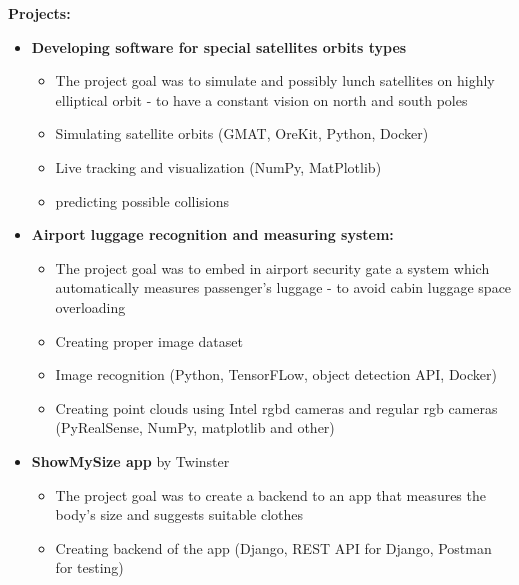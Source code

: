 \documentclass[10pt,a4paper,ragged2e,withhyper, normalphoto]{altacv}
\begin{document}
\begin{paracol}{2}


    \textbf{Projects:}
    \begin{itemize}
        \item\textbf{\textcolor{DarkPastelRed}{Developing software for special satellites orbits types}}
        \begin{itemize}
            \item The project goal was to simulate and possibly lunch satellites on highly elliptical orbit - to have a constant vision on north and south poles
            \item Simulating satellite orbits (GMAT, OreKit, Python, Docker)
            \item Live tracking and visualization (NumPy, MatPlotlib)
            \item predicting possible collisions
        \end{itemize}
        \item \textbf{\textcolor{DarkPastelRed}{Airport luggage recognition and measuring system:}}
        \begin{itemize}
            \item The project goal was to embed in airport security gate a system which automatically measures passenger's luggage - to avoid cabin luggage space overloading
            \item Creating proper image dataset
            \item Image recognition (Python, TensorFLow, object detection API, Docker)
            \item Creating point clouds using Intel rgbd cameras and regular rgb cameras (PyRealSense, NumPy, matplotlib and other)
        \end{itemize}
        \item \textcolor{DarkPastelRed}{\textbf{ShowMySize app} by Twinster}
        \begin{itemize}
            \item The project goal was to create a backend to an app that measures the body's size and suggests suitable clothes
            \item Creating backend of the app (Django, REST API for Django, Postman for testing)

\end{itemize}
\end{itemize}
\end{paracol}
\end{document}
